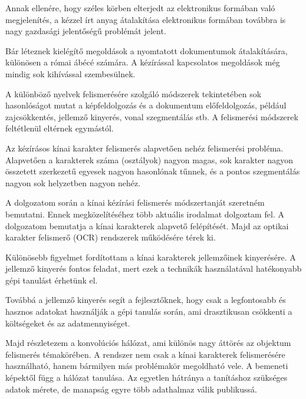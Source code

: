 

Annak ellenére, hogy széles körben elterjedt az elektronikus formában való megjelenítés, a kézzel írt anyag átalakítása elektronikus formában továbbra is nagy gazdasági jelentőségű problémát jelent.

Bár léteznek kielégítő megoldások a nyomtatott dokumentumok átalakítására, különösen a római ábécé számára. A kézírással kapcsolatos megoldások még mindig sok kihívással szembesülnek. 

A különböző nyelvek felismerésére szolgáló módszerek tekintetében sok hasonlóságot mutat a képfeldolgozás és a dokumentum előfeldolgozás, például zajcsökkentés, jellemző kinyerés, vonal szegmentálás stb. A felismerési módszerek feltétlenül eltérnek egymástól.

Az kézírásos kínai karakter felismerés alapvetően nehéz felismerési probléma. Alapvetően a karakterek száma (osztályok) nagyon magas, sok karakter nagyon összetett szerkezetű egyesek nagyon hasonlónak tűnnek, és a pontos szegmentálás nagyon sok helyzetben nagyon nehéz.

A dolgozatom során a kínai kézírási felismerés módszertanját szeretném bemutatni. Ennek megközelítéséhez több aktuális irodalmat dolgoztam fel. A dolgozatom bemutatja a kínai karakterek alapvető felépítését. Majd az optikai karakter felismerő (OCR) rendszerek működésére térek ki.

Különösebb figyelmet fordítottam a kínai karakterek jellemzőinek kinyerésére. A jellemző kinyerés fontos feladat, mert ezek a technikák használatával hatékonyabb gépi tanulást érhetünk el.

Továbbá a jellemző kinyerés segít a fejlesztőknek, hogy csak a legfontosabb és hasznos adatokat használják a gépi tanulás során, ami drasztikusan csökkenti a költségeket és az adatmennyiséget.

Majd részletezem a konvolúciós hálózat, ami különös nagy áttörés az objektum felismerés témakörében. A rendszer nem csak a kínai karakterek felismerésére használható, hanem bármilyen más problémakör megoldható vele. A bemeneti képektől függ a hálózat tanulása. Az egyetlen hátránya a tanításhoz szükséges adatok mérete, de manapság egyre több adathalmaz válik publikussá.
